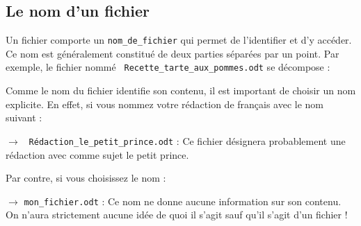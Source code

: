 \subsection{Le nom d'un fichier}
Un fichier comporte un \lstinline{nom_de_fichier}  qui permet de l’identifier et d’y accéder. Ce nom est généralement constitué de deux parties séparées par un point. Par exemple, le fichier nommé  \lstinline{ Recette_tarte_aux_pommes.odt} se décompose :

\begin{center}
\end{center}
Comme le nom du fichier identifie son contenu, il est important de choisir un nom explicite. En effet, si vous nommez votre rédaction de français avec le nom suivant :

$\rightarrow$ \lstinline{ Rédaction_le_petit_prince.odt} : Ce fichier désignera probablement une rédaction avec comme sujet le petit prince.

Par contre, si vous choisissez le nom :

$\rightarrow$ \lstinline{mon_fichier.odt} : Ce nom ne donne aucune information sur son contenu. On n’aura strictement aucune idée de quoi il s’agit sauf qu’il s’agit d’un fichier !

